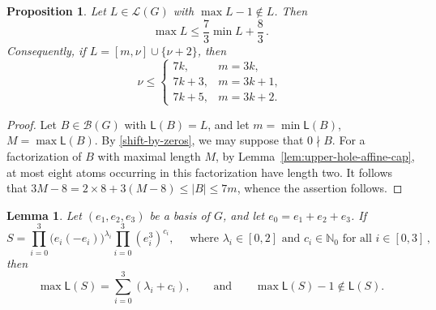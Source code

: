 \documentclass[a4paper, 10pt]{amsart}
\theoremstyle{plain}
\newtheorem{proposition}[theorem]{\bf Proposition}
\newtheorem{lemma}[theorem]{\bf Lemma}
\theoremstyle{definition}
\theoremstyle{definition}
\newcommand{\N}{\mathbb N}
\numberwithin{equation}{section}
\begin{document}
\begin{proposition} \label{prop:upper-hole-endpoint}
Let $L \in \mathcal L (G)$ with
$\max  L  -1\notin L $.  Then
\begin{equation}
\max  L  \le \frac{7}{3} \min  L  + \frac{8}{3} \,.\label{eq:cap-endpoint-bound}
\end{equation}
Consequently, if $L =[m,\nu]\cup\{\nu+2\}$, then
\begin{equation}
 \nu\le
 \begin{cases}
  7k,&m=3k,\\
  7k+3,&m=3k+1,\\
  7k+5,&m=3k+2.
 \end{cases}\label{eq:cap-preliminary-bound}
\end{equation}
\end{proposition}

\begin{proof}
Let $B \in \mathcal B (G)$ with $\mathsf L (B)=L$, and let $m=\min\mathsf L(B)$,
$M=\max\mathsf L(B)$. By  \eqref{shift-by-zeros}, we may suppose that $0 \nmid B$.
For a  factorization of $B$ with maximal length $M$,  by
Lemma~\ref{lem:upper-hole-affine-cap}, at most eight atoms occurring in this factorization  have length two.  It follows that $3M-8=2\times 8+3(M-8)\le |B|\le7m$, whence the assertion follows.
\end{proof}


\begin{lemma}\label{lem:oriented-cap-top-gap}
Let $(e_1,e_2,e_3)$ be a basis of $G$, and let   $e_0 = e_1+e_2+e_3$.
If
\[
 S=\prod_{i=0}^3 \big( e_i(-e_i) \big)^{\lambda_i}
   \prod_{i=0}^3(e_i^3)^{c_i},\quad
 \text{ where }\lambda_i\in [0,2] \text{ and } c_i\in \N_0 \text{ for all }i\in [0,3]\,,
\]
then
\[
 \max\mathsf L(S)=\sum_{i=0}^3(\lambda_i+c_i),
 \qquad \text{and} \qquad \max\mathsf L(S)-1\notin\mathsf L(S).
\]
\end{lemma}
\end{document}
